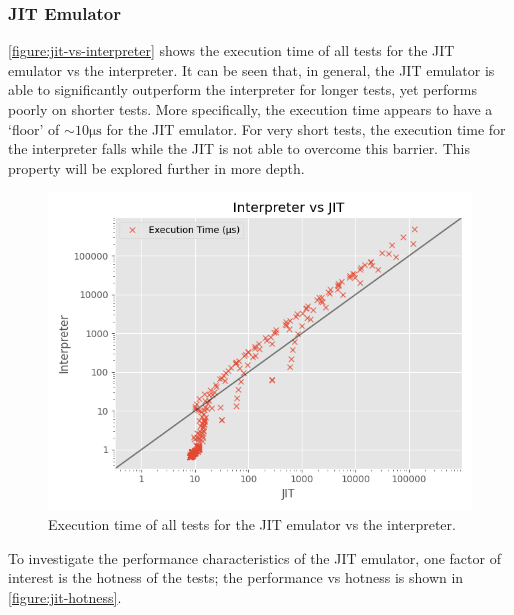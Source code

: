 \subsubsection{JIT Emulator}
\label{section:perf-jit}

\autoref{figure:jit-vs-interpreter} shows the execution time of all tests for the JIT emulator vs the interpreter. It can be seen that, in general, the JIT emulator is able to significantly outperform the interpreter for longer tests, yet performs poorly on shorter tests. More specifically, the execution time appears to have a `floor' of $\sim10\si{\micro\second}$ for the JIT emulator. For very short tests, the execution time for the interpreter falls while the JIT is not able to overcome this barrier. This property will be explored further in more depth.

\begin{figure}[H]
    \centering
    \includegraphics[scale=0.75]{output/graphs/scatter/vs/JIT-vs-Interpreter-time.png}
    \caption{Execution time of all tests for the JIT emulator vs the interpreter.}
    \label{figure:jit-vs-interpreter}
\end{figure}

To investigate the performance characteristics of the JIT emulator, one factor of interest is the hotness of the tests; the performance vs hotness is shown in \autoref{figure:jit-hotness}.

